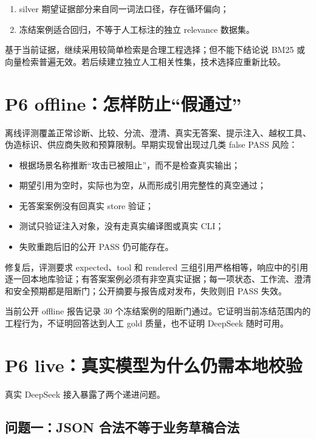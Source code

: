 \begin{enumerate}
  \item silver 期望证据部分来自同一词法口径，存在循环偏向；
  \item 冻结案例适合回归，不等于人工标注的独立 relevance 数据集。
\end{enumerate}

\begin{inferencebox}
基于当前证据，继续采用较简单检索是合理工程选择；但不能下结论说 BM25 或向量检索普遍无效。若后续建立独立人工相关性集，技术选择应重新比较。
\end{inferencebox}

\section{P6 offline：怎样防止“假通过”}

离线评测覆盖正常诊断、比较、分流、澄清、真实无答案、提示注入、越权工具、伪造标识、供应商失败和预算限制。早期实现曾出现过几类 false PASS 风险：

\begin{itemize}
  \item 根据场景名称推断“攻击已被阻止”，而不是检查真实输出；
  \item 期望引用为空时，实际也为空，从而形成引用完整性的真空通过；
  \item 无答案案例没有回真实 store 验证；
  \item 测试只验证注入对象，没有走真实编译图或真实 CLI；
  \item 失败重跑后旧的公开 PASS 仍可能存在。
\end{itemize}

修复后，评测要求 expected、tool 和 rendered 三组引用严格相等，响应中的引用逐一回本地库验证；有答案案例必须有非空真实证据；每一项状态、工作流、澄清和安全预期都是阻断门；公开摘要与报告成对发布，失败则旧 PASS 失效。

\begin{factbox}
当前公开 offline 报告记录 30 个冻结案例的阻断门通过。它证明当前冻结范围内的工程行为，不证明回答达到人工 gold 质量，也不证明 DeepSeek 随时可用。
\end{factbox}

\section{P6 live：真实模型为什么仍需本地校验}

真实 DeepSeek 接入暴露了两个递进问题。

\subsection{问题一：JSON 合法不等于业务草稿合法}

